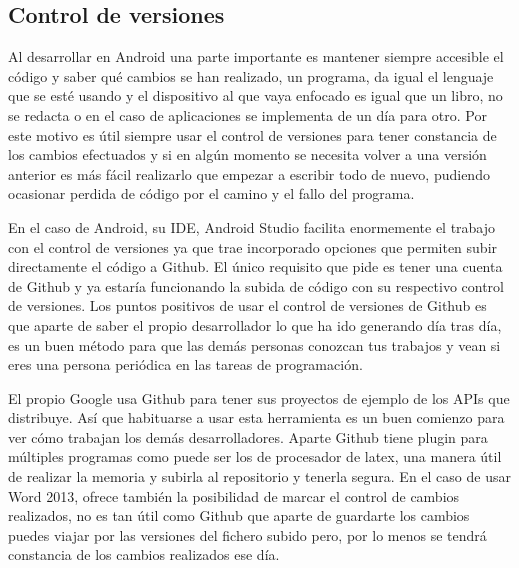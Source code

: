 \subsection{Control de versiones}
\label{subsecc:Control de versiones}

Al desarrollar en Android una parte importante es mantener siempre accesible el código y saber qué cambios se han realizado, un programa, da igual el lenguaje que se esté usando y el dispositivo al que vaya enfocado es igual que un libro, no se redacta o en el caso de aplicaciones se implementa de un día para otro. Por este motivo es útil siempre usar el control de versiones para tener constancia de los cambios efectuados y si en algún momento se necesita volver a una versión anterior es más fácil realizarlo que empezar a escribir todo de nuevo, pudiendo ocasionar perdida de código por el camino y el fallo del programa.

En el caso de Android, su IDE, Android Studio facilita enormemente el trabajo con el control de versiones ya que trae incorporado opciones que permiten subir directamente el código a Github. El único requisito que pide es tener una cuenta de Github y ya estaría funcionando la subida de código con su respectivo control de versiones.
Los puntos positivos de usar el control de versiones de Github es que aparte de saber el propio desarrollador lo que ha ido generando día tras día, es un buen método para que las demás personas conozcan tus trabajos y vean si eres una persona periódica en las tareas de programación.

El propio Google usa Github para tener sus proyectos de ejemplo de los APIs que distribuye. Así que habituarse a usar esta herramienta es un buen comienzo para ver cómo trabajan los demás desarrolladores.
Aparte Github tiene plugin para múltiples programas como puede ser los de procesador de latex, una manera útil de realizar la memoria y subirla al repositorio y tenerla segura.
En el caso de usar Word 2013, ofrece también la posibilidad de marcar el control de cambios realizados, no es tan útil como Github que aparte de guardarte los cambios puedes viajar por las versiones del fichero subido pero, por lo menos se tendrá constancia de los cambios realizados ese día.

